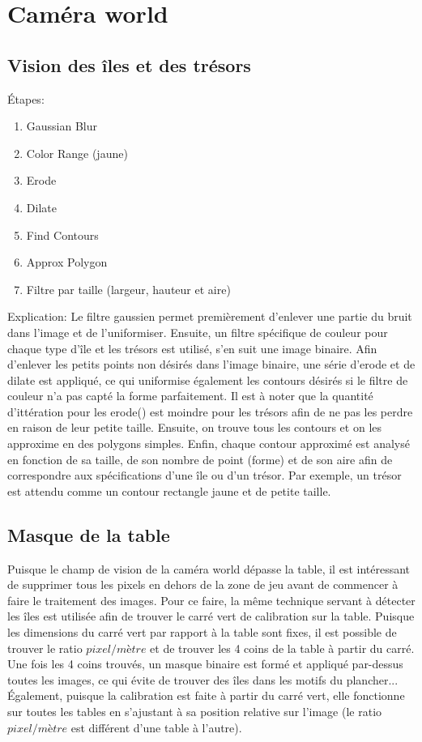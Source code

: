 \section{Caméra world} 

\subsection{Vision des îles et des trésors}

Étapes:
\begin{enumerate}
\item Gaussian Blur
\item Color Range (jaune)
\item Erode
\item Dilate
\item Find Contours
\item Approx Polygon
\item Filtre par taille (largeur, hauteur et aire)
\end{enumerate}


Explication: Le filtre gaussien permet premièrement d'enlever une partie du bruit dans l'image et de l'uniformiser. Ensuite, un filtre spécifique de couleur pour chaque type d'île et les trésors est utilisé, s'en suit une image binaire. Afin d'enlever les petits points non désirés dans l'image binaire, une série d'erode et de dilate est appliqué, ce qui uniformise également les contours désirés si le filtre de couleur n'a pas capté la forme parfaitement. Il est à noter que la quantité d'ittération pour les erode() est moindre pour les trésors afin de ne pas les perdre en raison de leur petite taille. Ensuite, on trouve tous les contours et on les approxime en des polygons simples. Enfin, chaque contour approximé est analysé en fonction de sa taille, de son nombre de point (forme) et de son aire afin de correspondre aux spécifications d'une île ou d'un trésor.  Par exemple, un trésor est attendu comme un contour rectangle jaune et de petite taille.

\subsection{Masque de la table}

Puisque le champ de vision de la caméra world dépasse la table, il est intéressant de supprimer tous les pixels en dehors de la zone de jeu avant de commencer à faire le traitement des images. Pour ce faire, la même technique servant à détecter les îles est utilisée afin de trouver le carré vert de calibration sur la table. Puisque les dimensions du carré vert par rapport à la table sont fixes, il est possible de trouver le ratio $pixel/mètre$ et de trouver les 4 coins de la table à partir du carré. Une fois les 4 coins trouvés, un masque binaire est formé et appliqué par-dessus toutes les images, ce qui évite de trouver des îles dans les motifs du plancher... Également, puisque la calibration est faite à partir du carré vert, elle fonctionne sur toutes les tables en s'ajustant à sa position relative sur l'image (le ratio $pixel/mètre$ est différent d'une table à l'autre).


